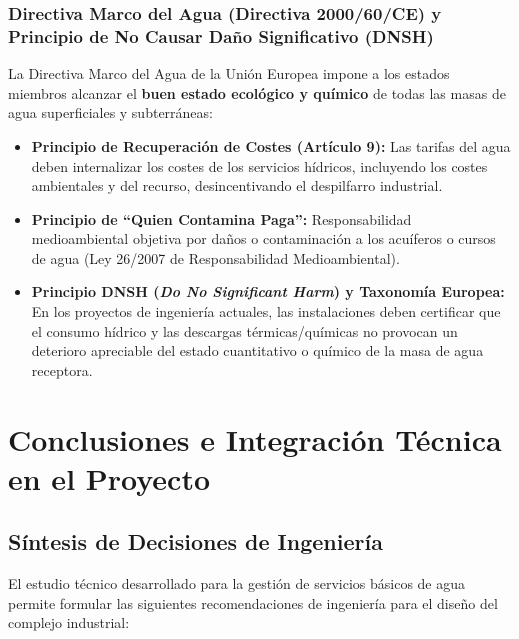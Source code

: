 \documentclass{report}
\begin{document}
\subsection{Directiva Marco del Agua (Directiva 2000/60/CE) y Principio de No Causar Daño Significativo (DNSH)}
La Directiva Marco del Agua de la Unión Europea impone a los estados miembros alcanzar el \textbf{buen estado ecológico y químico} de todas las masas de agua superficiales y subterráneas:
\begin{itemize}
    \item \textbf{Principio de Recuperación de Costes (Artículo 9):} Las tarifas del agua deben internalizar los costes de los servicios hídricos, incluyendo los costes ambientales y del recurso, desincentivando el despilfarro industrial.
    \item \textbf{Principio de ``Quien Contamina Paga'':} Responsabilidad medioambiental objetiva por daños o contaminación a los acuíferos o cursos de agua (Ley 26/2007 de Responsabilidad Medioambiental).
    \item \textbf{Principio DNSH (\textit{Do No Significant Harm}) y Taxonomía Europea:} En los proyectos de ingeniería actuales, las instalaciones deben certificar que el consumo hídrico y las descargas térmicas/químicas no provocan un deterioro apreciable del estado cuantitativo o químico de la masa de agua receptora.
\end{itemize}

\chapter{Conclusiones e Integración Técnica en el Proyecto}

\section{Síntesis de Decisiones de Ingeniería}
El estudio técnico desarrollado para la gestión de servicios básicos de agua permite formular las siguientes recomendaciones de ingeniería para el diseño del complejo industrial:
\end{document}
